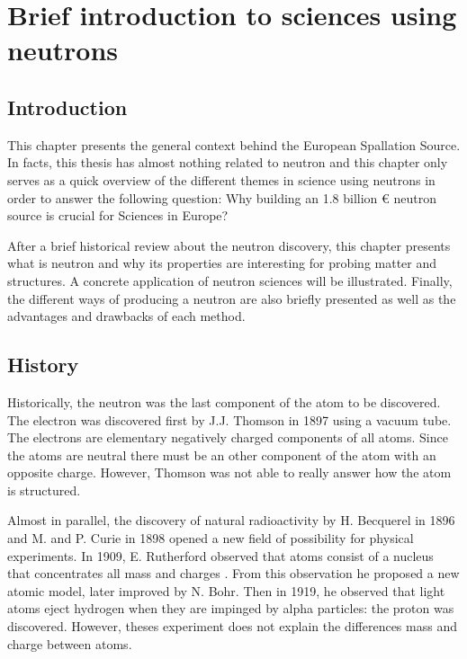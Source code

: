 \chapter{Brief introduction to sciences using neutrons}
\cleardoublepage

\minitoc

\section{Introduction}
\begin{refsection}
  \label{ch1:Introduction}
  This chapter presents the general context behind the European Spallation Source. In facts, this thesis has almost nothing related to neutron and this chapter only serves as a quick overview of the different themes in science using neutrons in order to answer the following question: Why building an 1.8 billion € neutron source is crucial for Sciences in Europe?

  After a brief historical review about the neutron discovery, this chapter presents what is neutron and why its properties are interesting for probing matter and structures. A concrete application of neutron sciences will be illustrated. Finally, the different ways of producing a neutron are also briefly presented as well as the advantages and drawbacks of each method.

  \section{History}
  Historically, the neutron was the last component of the atom to be discovered. The electron was discovered first by J.J. Thomson in 1897 using a vacuum tube. The electrons are elementary negatively charged components of all atoms. Since the atoms are neutral there must be an other component of the atom with an opposite charge. However, Thomson was not able to really answer how the atom is structured.

  Almost in parallel, the discovery of natural radioactivity by H. Becquerel in 1896 and M. and P. Curie in 1898 opened a new field of possibility for physical experiments. In 1909, E. Rutherford observed that atoms consist of a nucleus that concentrates all mass and charges \cite{Rutherford:1911zz}. 
  From this observation he proposed a new atomic model, later improved by N. Bohr. Then in 1919, he observed that light atoms eject hydrogen when they are impinged by alpha particles: the proton was discovered. However, theses experiment does not explain the differences mass and charge between atoms.


\end{refsection}
